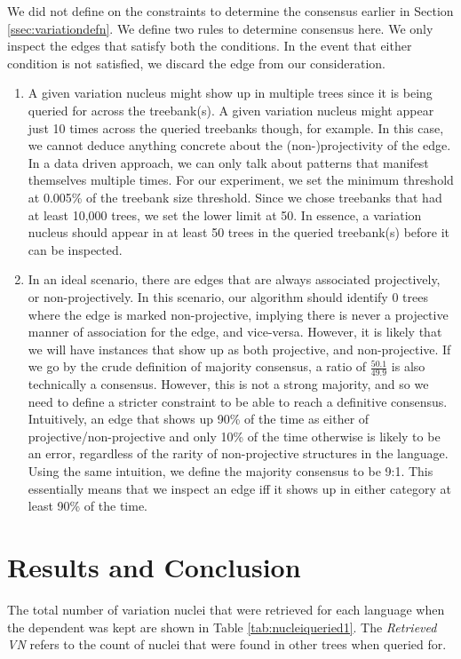We did not define on the constraints to determine the consensus earlier in Section \ref{ssec:variationdefn}. We define two rules to determine consensus here. We only inspect the edges that satisfy both the conditions. In the event that either condition is not satisfied, we discard the edge from our consideration.
\begin{enumerate}
    \item A given variation nucleus might show up in multiple trees since it is being queried for across the treebank(s). A given variation nucleus might appear just 10 times across the queried treebanks though, for example. In this case, we cannot deduce anything concrete about the (non-)projectivity of the edge. In a data driven approach, we can only talk about patterns that manifest themselves multiple times. For our experiment, we set the minimum threshold at 0.005\% of the treebank size threshold. Since we chose treebanks that had at least 10,000 trees, we set the lower limit at 50. In essence, a variation nucleus should appear in at least 50 trees in the queried treebank(s) before it can be inspected. 
    \item In an ideal scenario, there are edges that are always associated projectively, or non-projectively. In this scenario, our algorithm should identify 0 trees where the edge is marked non-projective, implying there is never a projective manner of association for the edge, and vice-versa. However, it is likely that we will have instances that show up as both projective, and non-projective. If we go by the crude definition of majority consensus, a ratio of \(\frac{50.1}{49.9}\) is also technically a consensus. However, this is not a strong majority, and so we need to define a stricter constraint to be able to reach a definitive consensus. Intuitively, an edge that shows up 90\% of the time as either of projective/non-projective and only 10\% of the time otherwise is likely to be an error, regardless of the rarity of non-projective structures in the language. Using the same intuition, we define the majority consensus to be 9:1. This essentially means that we inspect an edge iff it shows up in either category at least 90\% of the time.
\end{enumerate}

\section{Results and Conclusion}
\label{sec:nonprojconclude}

The total number of variation nuclei that were retrieved for each language when the dependent was kept are shown in Table \ref{tab:nucleiqueried1}. The \textit{Retrieved VN} refers to the count of nuclei that were found in other trees when queried for.

